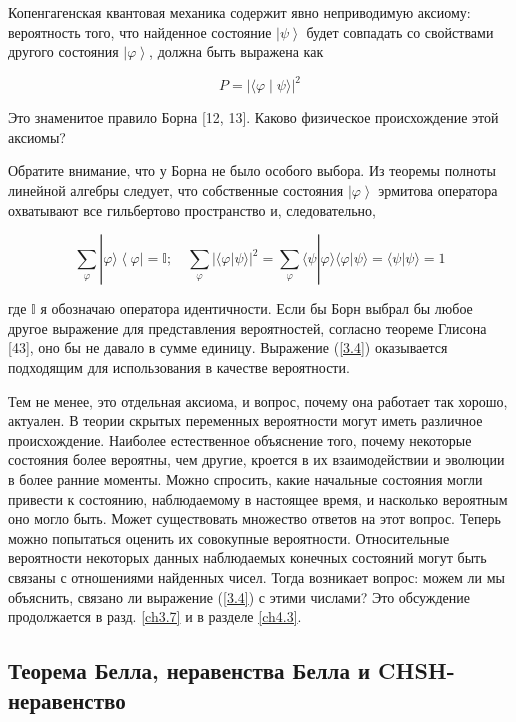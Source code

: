 \documentclass[main.tex]{subfiles}
\begin{document}
Копенгагенская квантовая механика содержит явно неприводимую аксиому: вероятность того, что найденное состояние $\left|\psi\right>$ будет совпадать со свойствами другого состояния $\left|\varphi\right>$, должна быть выражена как

\begin{equation}\label{3.4}
	P = | \langle \varphi \mid \psi \rangle |^2
\end{equation}
           
Это знаменитое правило Борна [12, 13]. Каково физическое происхождение этой аксиомы?

Обратите внимание, что у Борна не было особого выбора. Из теоремы полноты линейной алгебры следует, что собственные состояния $\left|\varphi\right>$ эрмитова оператора охватывают все гильбертово пространство и, следовательно,

\begin{equation}\label{3.5}
	\sum_{\varphi}|\varphi\rangle\left\langle\varphi\right|=\mathbb{I} ; \quad \sum_{\varphi}\left|\langle\varphi | \psi\rangle\right|^{2}=\sum_{\varphi}\langle\psi |\varphi\rangle\langle\varphi | \psi\rangle=\langle\psi | \psi\rangle= 1
\end{equation}

где $\mathbb{I}$ я обозначаю оператора идентичности. Если бы Борн выбрал бы любое другое выражение для представления вероятностей, согласно теореме Глисона [43], оно бы не давало в сумме единицу. Выражение (\ref{3.4}) оказывается  подходящим для использования в качестве вероятности.

Тем не менее, это отдельная аксиома, и вопрос, почему она работает так хорошо, актуален. В теории скрытых переменных вероятности могут иметь различное происхождение. Наиболее естественное объяснение того, почему некоторые состояния более вероятны, чем другие, кроется в их взаимодействии и эволюции в более ранние моменты. Можно спросить, какие начальные состояния могли привести к состоянию, наблюдаемому в настоящее время, и насколько вероятным оно могло быть. Может существовать множество ответов на этот вопрос. Теперь можно попытаться оценить их совокупные вероятности. Относительные вероятности некоторых данных наблюдаемых конечных состояний могут быть связаны с отношениями найденных чисел. Тогда возникает вопрос: можем ли мы объяснить, связано ли выражение (\ref{3.4}) с этими числами? Это обсуждение продолжается в разд. \ref{ch3.7} и в разделе \ref{ch4.3}.

\subsection{Теорема Белла, неравенства Белла и CHSH-неравенство}\label{ch3.6}
\end{document}
